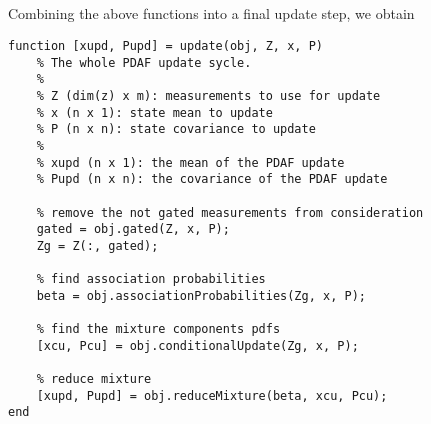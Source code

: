\documentclass[]{article}
\begin{document}
\subsection{}
Combining the above functions into a final update step, we obtain
\begin{lstlisting}[caption={PDAF Update Step}]
function [xupd, Pupd] = update(obj, Z, x, P)
    % The whole PDAF update sycle.
    %
    % Z (dim(z) x m): measurements to use for update
    % x (n x 1): state mean to update
    % P (n x n): state covariance to update
    %
    % xupd (n x 1): the mean of the PDAF update
    % Pupd (n x n): the covariance of the PDAF update

    % remove the not gated measurements from consideration
    gated = obj.gated(Z, x, P);
    Zg = Z(:, gated);

    % find association probabilities
    beta = obj.associationProbabilities(Zg, x, P);

    % find the mixture components pdfs
    [xcu, Pcu] = obj.conditionalUpdate(Zg, x, P);

    % reduce mixture
    [xupd, Pupd] = obj.reduceMixture(beta, xcu, Pcu);
end
\end{lstlisting}

\section{}
\end{document}
